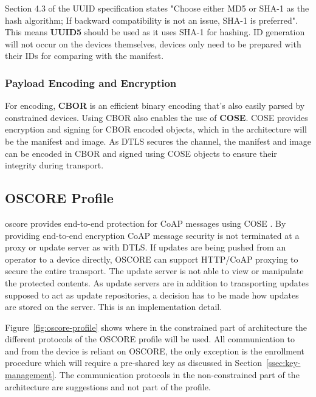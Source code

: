 \documentclass[0-thesis.tex]{subfiles}
\begin{document}
Section 4.3 of the UUID specification states "Choose either MD5 or SHA-1 as the hash
algorithm; If backward compatibility is not an issue, SHA-1 is preferred". This means
\textbf{UUID5} should be used as it uses SHA-1 for hashing. ID generation will not occur
on the devices themselves, devices only need to be prepared with their IDs for comparing
with the manifest.

\subsubsection{Payload Encoding and Encryption}
\label{sssec:encoding-encryption}
For encoding, \textbf{CBOR} is an efficient binary encoding that's also easily parsed by
constrained devices. Using CBOR also enables the use of \textbf{COSE}. COSE provides
encryption and signing for CBOR encoded objects, which in the architecture will be the
manifest and image. As DTLS secures the channel, the manifest and image can be encoded in
CBOR and signed using COSE objects to ensure their integrity during transport. 

\subsection{OSCORE Profile}
\label{ssec:oscore-profile}
\acrfull{oscore} provides end-to-end protection for CoAP messages using COSE
\parencite{oscore}. By providing end-to-end encryption CoAP message security is not
terminated at a proxy or update server as with DTLS. If updates are being pushed from an
operator to a device directly, OSCORE can support HTTP/CoAP proxying to secure the entire
transport. The update server is not able to view or manipulate the protected contents. As
update servers are in addition to transporting updates supposed to act as update
repositories, a decision has to be made how updates are stored on the server. This is an
implementation detail.

Figure~\ref{fig:oscore-profile} shows where in the constrained part of architecture the
different protocols of the OSCORE profile will be used. All communication to and from the
device is reliant on OSCORE, the only exception is the enrollment procedure which will
require a pre-shared key as discussed in Section~\ref{ssec:key-management}. The
communication protocols in the non-constrained part of the architecture are suggestions
and not part of the profile. 
\end{document}
